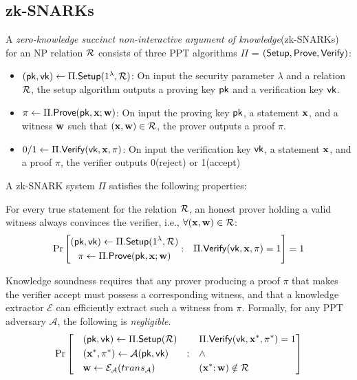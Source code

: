 \documentclass[sigconf,anonymous,review,balance=false]{acmart}
\begin{document}
\subsection{zk-SNARKs}
A \textit{zero-knowledge succinct non-interactive argument of knowledge}(zk-SNARKs) for an NP relation ${\mathcal{R}}$ consists of three PPT algorithms $\Pi$ = $({\sf Setup}, {\sf Prove}, {\sf Verify})$:
\begin{itemize}
    \item $({\sf pk}, {\sf vk}) \gets \Pi.{\sf Setup}(1^\lambda, {\mathcal{R}})$: On input the security parameter $\lambda$ and a relation ${\mathcal{R}}$, the setup algorithm outputs a proving key ${\sf pk}$ and a verification key ${\sf vk}$.
    \item $\pi \gets \Pi.{\sf Prove}({\sf pk}, {\mathbf{x}}; {\mathbf{w}})$: On input the proving key ${\sf pk}$, a statement ${\mathbf{x}}$, and a witness ${\mathbf{w}}$ such that $({\mathbf{x}}, {\mathbf{w}}) \in {\mathcal{R}}$, the prover outputs a proof $\pi$.
    \item $0/1 \gets \Pi.{\sf Verify}({\sf vk}, {\mathbf{x}}, \pi)$: On input the verification key ${\sf vk}$, a statement ${\mathbf{x}}$, and a proof $\pi$, the verifier outputs 0(reject) or 1(accept)
\end{itemize}
A zk-SNARK system $\Pi$ satisfies the following properties:

 For every true statement for the relation ${\mathcal{R}}$, an honest prover holding a valid witness always convinces the verifier, i.e., $\forall({\mathbf{x}}, {\mathbf{w}}) \in {\mathcal{R}}$:
    \begin{equation*}
        \Pr\left[
        \begin{matrix}
            \begin{gathered}
                ({\sf pk}, {\sf vk}) \gets \Pi.{\sf Setup}(1^\lambda, {\mathcal{R}}) \\
                \pi \gets \Pi.{\sf Prove}({\sf pk}, {\mathbf{x}}; {\mathbf{w}})
            \end{gathered} 
            : & 
            \begin{gathered}
                \Pi.{\sf Verify}({\sf vk}, {\mathbf{x}}, \pi) =1
            \end{gathered}
        \end{matrix}
        \right] = 1
    \end{equation*}

 Knowledge soundness requires that any prover producing a proof $\pi$ that makes the verifier accept must possess a corresponding witness, and that a knowledge extractor $\mathcal{E}$ can efficiently extract such a witness from $\pi$. Formally, for any PPT adversary $\mathcal{A}$, the following is \textit{negligible}.
\begin{equation*}
\Pr\left[
\begin{aligned}
     \quad & ({\sf pk}, {\sf vk}) \gets \Pi.{\sf Setup}({\mathcal{R}}) & & \Pi.{\sf Verify}({\sf vk}, {\mathbf{x}}^*, \pi^*) = 1\\
     &  ({\mathbf{x}}^*, \pi^*) \gets {\mathcal{A}}({\sf pk}, {\sf vk}) &:\quad & \wedge \\
     & {\mathbf{w}} \gets {\mathcal{E}}_{\mathcal{A}}(trans_{\mathcal{A}}) & & ({\mathbf{x}}^*; {\mathbf{w}}) \notin {\mathcal{R}} \quad \quad
\end{aligned}
\right]
\end{equation*}
\end{document}
